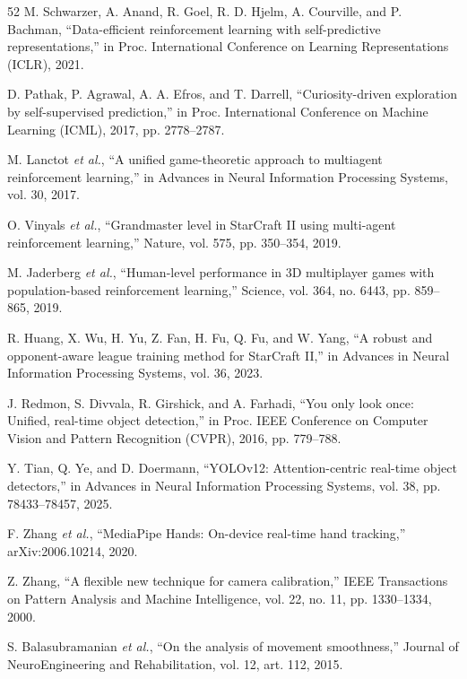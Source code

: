 \documentclass[journal,twoside,web]{ieeecolor2}
\begin{document}
\begin{thebibliography}{52}
 M. Schwarzer, A. Anand, R. Goel, R. D. Hjelm, A. Courville, and P. Bachman, ``Data-efficient reinforcement learning with self-predictive representations,'' in Proc. International Conference on Learning Representations (ICLR), 2021.

 D. Pathak, P. Agrawal, A. A. Efros, and T. Darrell, ``Curiosity-driven exploration by self-supervised prediction,'' in Proc. International Conference on Machine Learning (ICML), 2017, pp. 2778--2787.

 M. Lanctot \emph{et al.}, ``A unified game-theoretic approach to multiagent reinforcement learning,'' in Advances in Neural Information Processing Systems, vol. 30, 2017.

 O. Vinyals \emph{et al.}, ``Grandmaster level in StarCraft II using multi-agent reinforcement learning,'' Nature, vol. 575, pp. 350--354, 2019.

 M. Jaderberg \emph{et al.}, ``Human-level performance in 3D multiplayer games with population-based reinforcement learning,'' Science, vol. 364, no. 6443, pp. 859--865, 2019.

 R. Huang, X. Wu, H. Yu, Z. Fan, H. Fu, Q. Fu, and W. Yang, ``A robust and opponent-aware league training method for StarCraft II,'' in Advances in Neural Information Processing Systems, vol. 36, 2023.

 J. Redmon, S. Divvala, R. Girshick, and A. Farhadi, ``You only look once: Unified, real-time object detection,'' in Proc. IEEE Conference on Computer Vision and Pattern Recognition (CVPR), 2016, pp. 779--788.

 Y. Tian, Q. Ye, and D. Doermann, ``YOLOv12: Attention-centric real-time object detectors,'' in Advances in Neural Information Processing Systems, vol. 38, pp. 78433--78457, 2025.

 F. Zhang \emph{et al.}, ``MediaPipe Hands: On-device real-time hand tracking,'' arXiv:2006.10214, 2020.

 Z. Zhang, ``A flexible new technique for camera calibration,'' IEEE Transactions on Pattern Analysis and Machine Intelligence, vol. 22, no. 11, pp. 1330--1334, 2000.

 S. Balasubramanian \emph{et al.}, ``On the analysis of movement smoothness,'' Journal of NeuroEngineering and Rehabilitation, vol. 12, art. 112, 2015.

\end{thebibliography}
\end{document}
